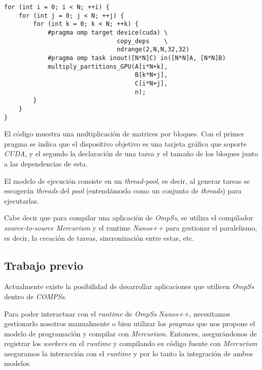 \begin{minipage}{\linewidth}
\begin{lstlisting}[caption={Multiplicación de un bloque de una matriz utilizando GPUs.}, captionpos=b, label={lst:ompssmatmul.cc}, style=JStyle]
for (int i = 0; i < N; ++i) {
    for (int j = 0; j < N; ++j) {
        for (int k = 0; k < N; ++k) {
            #pragma omp target device(cuda) \
                               copy_deps    \
                               ndrange(2,N,N,32,32)
            #pragma omp task inout([N*N]C) in([N*N]A, [N*N]B)
            multiply_partitions_GPU(A[i*N+k], 
                                    B[k*N+j], 
                                    C[i*N+j], 
                                    n);
        }
    }
}
\end{lstlisting}
\end{minipage}

El código muestra una multiplicación de matrices por bloques. Con el primer pragma se indica que el dispositivo objetivo es una tarjeta gráfica que soporte \textit{CUDA}, y el segundo la declaración de una tarea y el tamaño de los bloques junto a las dependencias de esta.
\par\bigskip

El modelo de ejecución consiste en un \textit{thread-pool}, es decir, al generar tareas se escogerán \textit{threads} del \textit{pool} (entendámoslo como un conjunto de \textit{threads}) para ejecutarlas.
\par\bigskip

Cabe decir que para compilar una aplicación de \textit{OmpSs}, se utiliza el compilador \textit{source-to-source Mercurium} y el runtime \textit{Nanos++} para gestionar el paralelismo, es decir, la creación de tareas, sincronización entre estas, etc.

\subsection{Trabajo previo} 
\label{sec:compssompss}

Actualmente existe la posibilidad de desarrollar aplicaciones que utilicen \textit{OmpSs} dentro de \textit{COMPSs}. 
\par\bigskip
Para poder interactuar con el \textit{runtime} de \textit{OmpSs} \textit{Nanos++}, necesitamos gestionarlo nosotros manualmente o bien utilizar los \textit{pragmas} que nos propone el modelo de programación y compilar con \textit{Mercurium}. Entonces, asegurándonos de registrar los \textit{workers} en el \textit{runtime} y compilando su código fuente con \textit{Mercurium} aseguramos la interacción con el \textit{runtime} y por lo tanto la integración de ambos modelos.

